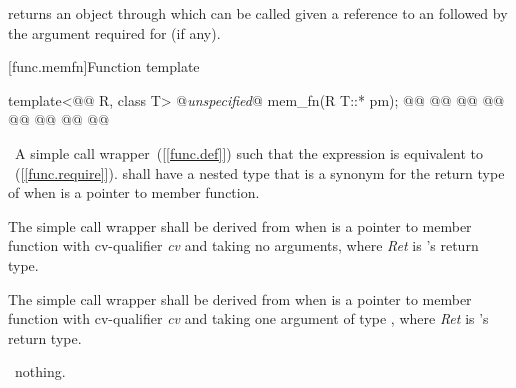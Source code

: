 \documentclass[american,twoside]{book}
\begin{document}
\begin{itemdescr}
\pnum
{} returns an object through which 
can be called given a reference to an  followed by the argument
required for  (if any).
\end{itemdescr}

[func.memfn]{\marktr{}Function template }

%
\begin{itemdecl}
template<@@ R, class T> @\textit{unspecified}@ mem_fn(R T::* pm); 
@@
  @@
@@
  @@
@@
  @@
@@
  @@
\end{itemdecl}

\begin{itemdescr}
\pnum\returns\ A simple call wrapper~([\ref{func.def}]) 
such that the expression  is equivalent
to ~([\ref{func.require}]).
 shall have a nested type  that is a synonym
for the return type of  when  is a pointer to
member function.

\pnum{}%
The simple call wrapper shall be derived
from  when  is
a pointer to member function with cv-qualifier \textit{cv} and taking no
arguments, where \textit{Ret} is 's return type.

\pnum{}%
The simple call wrapper shall be derived from
 when  is
a pointer to member function with cv-qualifier \textit{cv} and taking
one argument of type , where \textit{Ret} is 's return type.

\pnum\throws\ nothing.

\pnum{}
\end{itemdescr}
\end{document}
